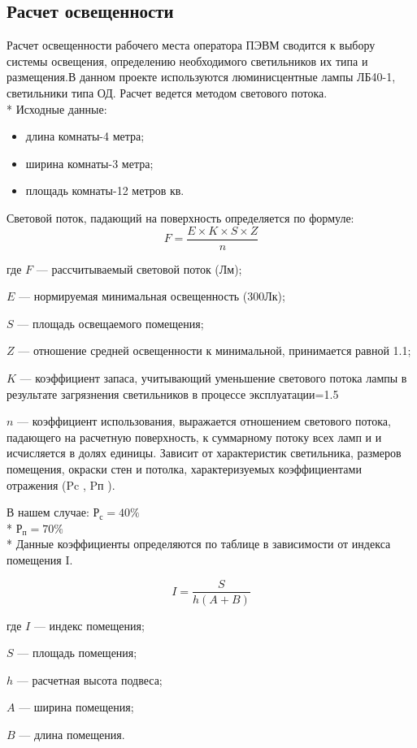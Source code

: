 \subsection{Расчет освещенности}
Расчет освещенности рабочего места оператора ПЭВМ сводится к выбору 
системы освещения, определению необходимого светильников  их типа и
размещения.В данном проекте используются люминисцентные лампы ЛБ40-1,
светильники типа ОД. Расчет ведется методом светового потока. \\*
Исходные данные:
\begin{itemize}
	\item{} длина комнаты-4 метра;
	\item{} ширина комнаты-3 метра;
	\item{} площадь комнаты-12 метров кв.
\end{itemize}
Световой поток, падающий на поверхность определяется по формуле:
\begin{equation}
F = \frac{ E \times K \times S \times Z }{n}
\end{equation}
\begin{ESKDexplanation}
	\item[где ] $F$ --- рассчитываемый световой поток (Лм);
	\item{} $E$ --- нормируемая минимальная освещенность (300Лк);
	\item{} $S$ --- площадь освещаемого помещения;
	\item{} $Z$ --- отношение средней освещенности к минимальной, принимается равной 1.1;
	\item{} $K$ --- коэффициент запаса, учитывающий уменьшение светового потока лампы
	в результате загрязнения светильников в процессе эксплуатации=1.5
	\item{} $n$ --- коэффициент использования, выражается отношением светового потока,
	падающего на расчетную поверхность, к суммарному потоку всех ламп и    и
	исчисляется в долях единицы. Зависит от характеристик светильника, размеров помещения,
	окраски стен и потолка, характеризуемых коэффициентами отражения (Pc , Pп ).
\end{ESKDexplanation}
В нашем случае:
$Р_{с} = 40\%$ \\*
$Р_{п} = 70\%$ \\ *
Данные коэффициенты определяются по таблице в зависимости от индекса помещения I.

\begin{equation}
I = \frac{S}{h(A + B)}
\end{equation}
\begin{ESKDexplanation}
	\item[где ]{} $I$ --- индекс помещения;
	\item{} $S$ --- площадь помещения;
	\item{} $h$ --- расчетная высота подвеса;
	\item{} $A$ --- ширина помещения;
	\item{} $B$ --- длина помещения.
\end{ESKDexplanation}

